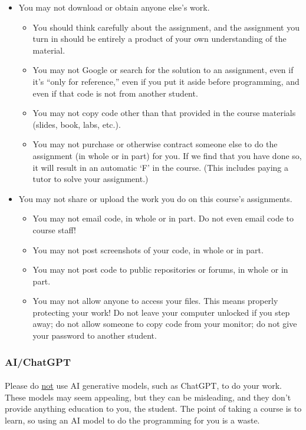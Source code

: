 \documentclass[letter,10pt]{article}
\begin{document}
\begin{itemize}
\item You may not download or obtain anyone else’s work.
\begin{itemize}
\item You should think carefully about the assignment, and the assignment you turn in should be entirely a product of your own understanding of the material.
\item You may not Google or search for the solution to an assignment, even if it’s ``only for reference,'' even if you put it aside before programming, and even if that code is not from another student.
\item You may not copy code other than that provided in the course materials (slides, book, labs, etc.).
\item You may not purchase or otherwise contract someone else to do the assignment (in whole or in part) for you. If we find that you have done so, it will result in an automatic `F' in the course. (This includes paying a tutor to solve your assignment.)
\end{itemize}
\item You may not share or upload the work you do on this course’s assignments.
\begin{itemize}
\item You may not email code, in whole or in part. Do not even email code to course staff!
\item You may not post screenshots of your code, in whole or in part.
\item You may not post code to public repositories or forums, in whole or in part.
\item You may not allow anyone to access your files. This means properly protecting your work! Do not leave your computer unlocked if you step away; do not allow someone to copy code from your monitor; do not give your password to another student.
\end{itemize}
\end{itemize}

\subsubsection*{AI/ChatGPT}
\paragraph{}Please do \underline{not} use AI generative models, such as ChatGPT, to do your work. These models may seem appealing, but they can be misleading, and they don't provide anything education to you, the student. The point of taking a course is to learn, so using an AI model to do the programming for you is a waste.
\end{document}
